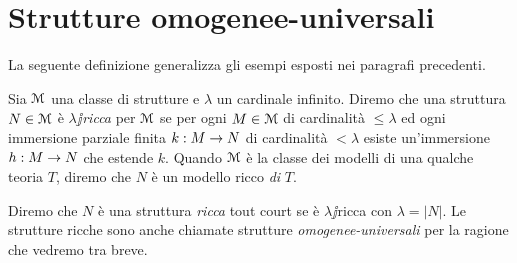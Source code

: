% 
% 
% 
% 
% 




\section{Strutture omogenee-universali}\label{omogenee-universali}

La seguente definizione generalizza gli esempi esposti nei paragrafi precedenti.

\begin{definition}
Sia $\EuScript M$ una classe di strutture e $\lambda$ un cardinale infinito. Diremo che una struttura $N\in\EuScript M$ \`e \emph{$\lambda\jj$ricca\/} per $\EuScript M$ se per ogni $M\in\EuScript M$ di cardinalit\`a $\le\lambda$ ed ogni immersione parziale finita $k:M\rightarrow N$ di cardinalit\`a $<\lambda$ esiste un'immersione $h:M\rightarrow N$ che estende $k$. Quando $\EuScript M$ \`e la classe dei modelli di una qualche teoria $T$, diremo che $N$ \`e un modello ricco \emph{di\/} $T$.

Diremo che $N$ \`e una struttura \emph{ricca\/} tout court  se \`e $\lambda\jj$ricca con $\lambda=|N|$. Le strutture ricche sono anche chiamate strutture \emph{omogenee-universali\/} per la ragione che vedremo tra breve.\QED
\end{definition}


